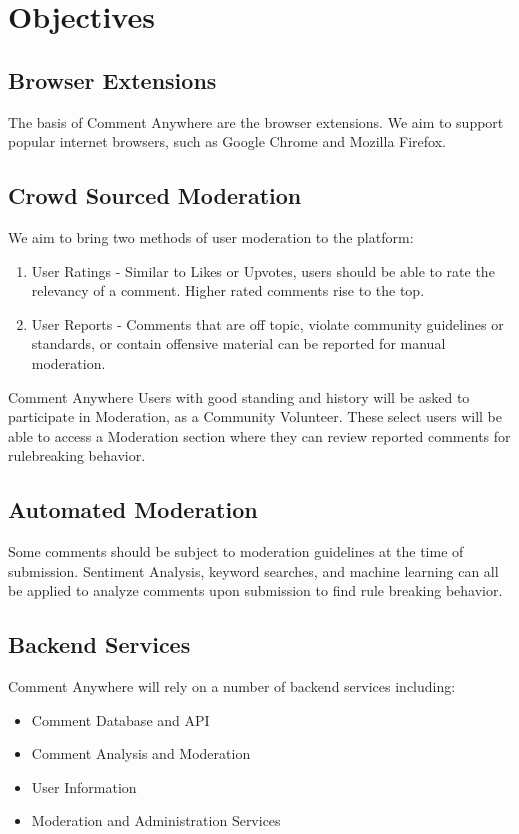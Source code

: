 \documentclass[proposal.tex]{subfiles}
\begin{document}
    
\section{Objectives}

\subsection{Browser Extensions}

The basis of Comment Anywhere are the browser extensions. 
We aim to support popular internet browsers, such as Google Chrome and Mozilla Firefox.

\subsection{Crowd Sourced Moderation}

We aim to bring two methods of user moderation to the platform:

\begin{enumerate}
    \item User Ratings - Similar to Likes or Upvotes, users should be able to rate the relevancy of a comment. Higher rated comments rise to the top.
    \item User Reports - Comments that are off topic, violate community guidelines or standards, or contain offensive material can be reported for manual moderation.
\end{enumerate}

Comment Anywhere Users with good standing and history will be asked to participate in Moderation, as a Community Volunteer.
These select users will be able to access a Moderation section where they can review reported comments for rulebreaking behavior.

\subsection{Automated Moderation}

Some comments should be subject to moderation guidelines at the time of submission.
Sentiment Analysis, keyword searches, and machine learning can all be applied to analyze comments upon submission to find rule breaking behavior.

\subsection{Backend Services}

Comment Anywhere will rely on a number of backend services including:

\begin{itemize}
    \item Comment Database and API
    \item Comment Analysis and Moderation
    \item User Information
    \item Moderation and Administration Services
\end{itemize}
\end{document}
